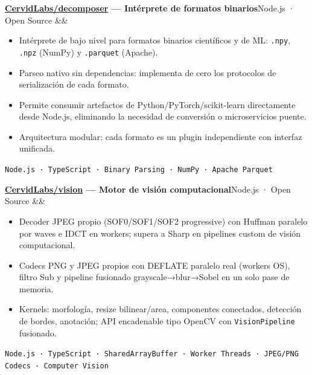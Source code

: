 \documentclass[10pt, letterpaper]{article}
\newcommand{\entry}[3]{%
  \noindent\textbf{#1}\hfill\textcolor{muted}{\small #2}%
  \ifx&#3&\else\\\textcolor{muted}{\small #3}\fi%
  \par\vspace{0.1em}%
}
\begin{document}
\vspace{0.5em}

\entry{\href{https://github.com/CervidLabs/decomposer}{CervidLabs/decomposer} — Intérprete de formatos binarios}{Node.js · Open Source}{}
\begin{itemize}
  \item Intérprete de bajo nivel para formatos binarios científicos y de ML: \texttt{.npy}, \texttt{.npz} (NumPy) y
        \texttt{.parquet} (Apache).
  \item Parseo nativo sin dependencias: implementa de cero los protocolos de serialización de cada formato.
  \item Permite consumir artefactos de Python/PyTorch/scikit-learn directamente desde Node.js, eliminando
        la necesidad de conversión o microservicios puente.
  \item Arquitectura modular: cada formato es un plugin independiente con interfaz unificada.
\end{itemize}
\vspace{0.2em}
\textcolor{muted}{\small \texttt{Node.js · TypeScript · Binary Parsing · NumPy · Apache Parquet}}

\vspace{0.5em}

\entry{\href{https://github.com/CervidLabs/vision}{CervidLabs/vision} — Motor de visión computacional}{Node.js · Open Source}{}
\begin{itemize}
  \item Decoder JPEG propio (SOF0/SOF1/SOF2 progressive) con Huffman paralelo por waves e IDCT en
        workers; supera a Sharp en pipelines custom de visión computacional.
  \item Codecs PNG y JPEG propios con DEFLATE paralelo real (workers OS), filtro Sub y pipeline
        fusionado grayscale→blur→Sobel en un solo pase de memoria.
  \item Kernels: morfología, resize bilinear/area, componentes conectados, detección de bordes, anotación;
        API encadenable tipo OpenCV con \texttt{VisionPipeline} fusionado.
\end{itemize}
\vspace{0.2em}
\textcolor{muted}{\small \texttt{Node.js · TypeScript · SharedArrayBuffer · Worker Threads · JPEG/PNG Codecs · Computer Vision}}

\vspace{0.5em}
\end{document}

